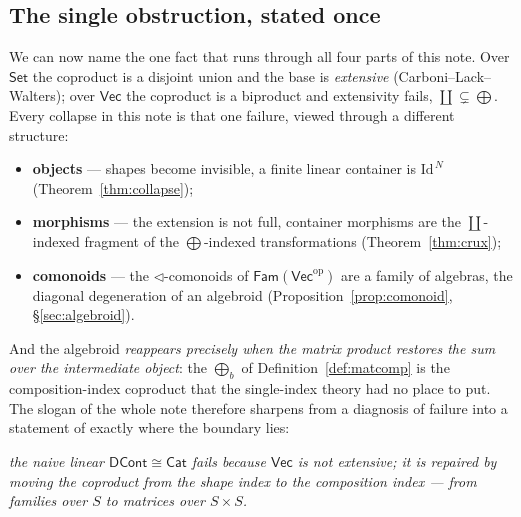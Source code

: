 \documentclass[11pt]{amsart}
\theoremstyle{plain}
\theoremstyle{definition}
\renewcommand{\Vec}{\mathsf{Vec}}
\newcommand{\Set}{\mathsf{Set}}
\newcommand{\Cat}{\mathsf{Cat}}
\newcommand{\Fam}{\mathsf{Fam}}
\newcommand{\op}{\mathrm{op}}
\newcommand{\Id}{\mathrm{Id}}
\newcommand{\iso}{\cong}
\DeclareMathOperator{\dcoprod}{\textstyle\coprod}
\begin{document}
\subsection{The single obstruction, stated once}

We can now name the one fact that runs through all four parts of this note. Over
$\Set$ the coproduct is a disjoint union and the base is \emph{extensive}
(Carboni--Lack--Walters); over $\Vec$ the coproduct is a biproduct and extensivity
fails, $\dcoprod\subsetneq\bigoplus$. Every collapse in this note is that one
failure, viewed through a different structure:
\begin{itemize}
\item \textbf{objects} --- shapes become invisible, a finite linear container is
  $\Id^{\,N}$ (Theorem~\ref{thm:collapse});
\item \textbf{morphisms} --- the extension is not full, container morphisms are the
  $\dcoprod$-indexed fragment of the $\bigoplus$-indexed transformations
  (Theorem~\ref{thm:crux});
\item \textbf{comonoids} --- the $\lhd$-comonoids of $\Fam(\Vec^\op)$ are a family
  of algebras, the diagonal degeneration of an algebroid
  (Proposition~\ref{prop:comonoid}, \S\ref{sec:algebroid}).
\end{itemize}
And the algebroid \emph{reappears precisely when the matrix product restores the
sum over the intermediate object}: the $\bigoplus_b$ of Definition~\ref{def:matcomp}
is the composition-index coproduct that the single-index theory had no place to put.
The slogan of the whole note therefore sharpens from a diagnosis of failure into a
statement of exactly where the boundary lies:
\begin{center}\itshape
the naive linear $\mathsf{DCont}\iso\Cat$ fails because $\Vec$ is not extensive;
it is repaired by moving the coproduct from the shape index to the composition
index --- from families over $S$ to matrices over $S\times S$.
\end{center}
\end{document}

